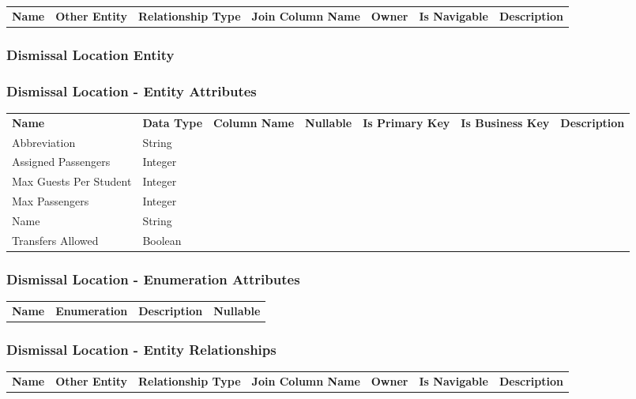 \begin{tabular}{llllllp{2.0cm}}
\bfseries Name & \bfseries Other Entity & \bfseries Relationship Type & \bfseries Join Column Name & \bfseries Owner & \bfseries Is Navigable & \bfseries Description\\
\end{tabular}


\subsubsection{ Dismissal Location Entity }

\subsubsection*{ Dismissal Location - Entity Attributes }

\begin{tabular}{lllcccl}
\bfseries Name & \bfseries Data Type & \bfseries Column Name & \bfseries Nullable & \bfseries Is Primary Key & \bfseries Is Business Key & \bfseries Description\\
Abbreviation & String &  &  &  &  &  \\
Assigned Passengers & Integer &  &  &  &  &  \\
Max Guests Per Student & Integer &  &  &  &  &  \\
Max Passengers & Integer &  &  &  &  &  \\
Name & String &  &  &  &  &  \\
Transfers Allowed & Boolean &  &  &  &  &  \\
\end{tabular}

\subsubsection*{ Dismissal Location - Enumeration Attributes}

\begin{tabular}{lcp{6.0cm}c}
\bfseries Name & \bfseries Enumeration & \bfseries Description & \bfseries Nullable \\
\end{tabular}

\subsubsection*{ Dismissal Location - Entity Relationships}

\begin{tabular}{llllllp{2.0cm}}
\bfseries Name & \bfseries Other Entity & \bfseries Relationship Type & \bfseries Join Column Name & \bfseries Owner & \bfseries Is Navigable & \bfseries Description\\
\end{tabular}


